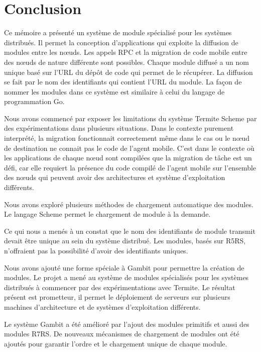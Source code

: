 
\chapter{Conclusion}

Ce mémoire a présenté un système de module spécialisé pour les systèmes
distribués. Il permet la conception d'applications qui exploite la diffusion de
modules entre les nœuds. Les appels RPC et la migration de code mobile entre
des nœuds de nature différente sont possibles. Chaque module diffusé a un nom
unique basé sur l'URL du dépôt de code qui permet de le récupérer. La diffusion
se fait par le nom des identifiants qui contient l'URL du module. La façon de nommer les
modules dans ce système est similaire à celui du langage de programmation Go.

Nous avons commencé par exposer les limitations du système Termite Scheme par
des expérimentations dans plusieurs situations. Dans le contexte purement
interprété, la migration fonctionnait correctement même dans le cas ou le nœud
de destination ne connait pas le code de l'agent mobile.  C'est dans le
contexte où les applications de chaque nœud sont compilées que la migration de
tâche est un défi, car elle requiert la présence du code compilé de l'agent
mobile sur l'ensemble des nœuds qui peuvent avoir des architectures et système
d'exploitation différents.

Nous avons exploré plusieurs méthodes de chargement automatique des modules.
Le langage Scheme permet le chargement de module à la demande.

Ce qui nous a menés à un constat que le nom des identifiants de module transmit
devait être unique au sein du système distribué. Les modules, basés sur R5RS,
n'offraient pas la possibilité d'avoir des identifiants uniques.

Nous avons ajouté une forme spéciale à Gambit pour permettre la création de
modules. Le projet a mené au système de modules spécialisés pour les systèmes
distribués à commencer par des expérimentations avec Termite. Le résultat
présent est prometteur, il permet le déploiement de serveurs sur plusieurs
machines d'architecture et de systèmes d'exploitation différents.

Le système Gambit a été amélioré par l'ajout des modules primitifs et aussi
des modules R7RS. De nouveaux mécanismes de chargement de modules ont été
ajoutés pour garantir l'ordre et le chargement unique de chaque module.

